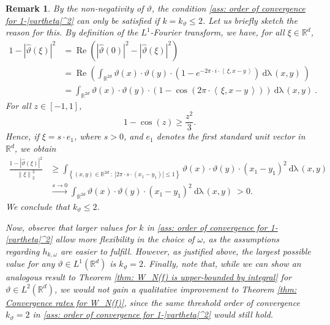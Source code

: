 \documentclass[11pt]{amsart}
\newcommand{\R}{{\mathbb{R}}}
\newcommand{\dxy}{\:\mathrm{d\lambda}\,(x,y)\:}
\newcommand{\norm}[1]{\ensuremath{\left\lVert\text{}#1\text{}\right\rVert}}
\newcommand{\ip}[1]{\ensuremath{\left<\text{} \, #1 \, \text{}\right>}}
\newcommand{\set}[1]{\ensuremath{\left\{\text{}#1\text{}\right\}}}
\DeclareMathOperator{\re}{Re}
\newtheorem{remark}[theorem]{Remark}
\newenvironment{proof sketch} {\textit{Proof sketch.}}{}
\begin{document}
  \begin{remark}
    By the non-negativity of $\vartheta$, the condition \eqref{ass: order of convergence for 1-|vartheta|^2} can only be satisfied if $k=k_\vartheta\leq 2$. Let us briefly sketch the reason for this. By definition of the $L^1$-Fourier transform, we have, for all $\xi \in \R^d$,
    \begin{align*}
      1-|\widehat{\vartheta}(\xi)|^2&= \re\left(|\widehat{\vartheta}(0)|^2-|\widehat{\vartheta}(\xi)|^2\right)\\
      &= \re\left(\int_{\R^{2d}} \vartheta(x)\cdot \vartheta(y) \cdot \left(1-e^{-2\pi \cdot i \cdot \ip{\xi,x-y}}\right)\dxy\right) \\
      &= \int_{\R^{2d}} \vartheta(x)\cdot \vartheta(y) \cdot \left(1-\cos(2\pi \cdot \ip{\xi,x-y})\right)\dxy.
    \end{align*} 
    For all $z \in [-1,1]$, 
    \[1-\cos(z)\geq \frac{z^2}{3}.\] 
    Hence, if $\xi=s\cdot e_1$, where $s>0$, and $e_1$ denotes the first standard unit vector in $\R^d$, we obtain
    \begin{align*}
      \frac{1-|\widehat{\vartheta}(\xi)|^2}{\norm{\xi}_2^2} &\geq \int_{\set{(x,y) \in \R^{2d}~:~|2\pi\cdot s\cdot (x_1-y_1)|\leq 1}} \vartheta(x)\cdot \vartheta(y) \cdot (x_1-y_1)^2 \dxy\\
      &\xrightarrow{s \to 0} \int_{\R^{2d}} \vartheta(x)\cdot \vartheta(y) \cdot \left(x_1-y_1\right)^2\dxy>0.
    \end{align*}
    We conclude that $k_\vartheta \leq 2$.
  
  
    Now, observe that larger values for $k$ in \eqref{ass: order of convergence for 1-|vartheta|^2} allow more flexibility in the choice of $\omega$, as the assumptions regarding $h_{k,\omega}$ are easier to fulfill. However, as justified above, the largest possible value for any $\vartheta \in L^1(\R^d)$ is $k_\vartheta=2$. Finally, note that, while we can show an analogous result to Theorem \ref{thm: W_N(f) is upper-bounded by integral} for $\vartheta \in L^2(\R^d)$, we would not gain a qualitative improvement to Theorem \ref{thm: Convergence rates for W_N(f)}, since the same threshold order of convergence $k_\vartheta=2$ in \eqref{ass: order of convergence for 1-|vartheta|^2} would still hold.
  \end{remark}
  
\end{document}
